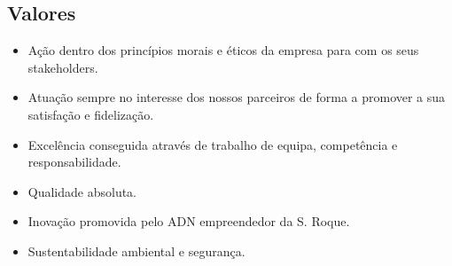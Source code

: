 \subsection{Valores}
\begin{itemize}
	\setlength\itemsep{-0.3em}
	\item Ação dentro dos princípios morais e éticos da empresa para com os seus stakeholders.
	\item Atuação sempre no interesse dos nossos parceiros de forma a promover a sua satisfação e fidelização.
	\item Excelência conseguida através de trabalho de equipa, competência e responsabilidade.
	\item Qualidade absoluta.
	\item Inovação promovida pelo ADN empreendedor da S. Roque.
	\item Sustentabilidade ambiental e segurança.
\end{itemize}\par
